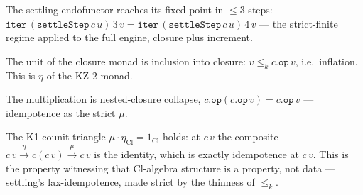 \begin{theorem}\label{thm:settle-step-settles}\leanok{}
The settling-endofunctor reaches its fixed point in $\le 3$ steps:
$\texttt{iter}\,(\texttt{settleStep}\,c\,u)\,3\,v =
\texttt{iter}\,(\texttt{settleStep}\,c\,u)\,4\,v$ --- the strict-finite regime
applied to the full engine, closure plus increment.
\end{theorem}
\begin{theorem}\label{thm:kz-unit}\leanok{}
The unit of the closure monad is inclusion into closure: $v \le_k c.\texttt{op}\,v$,
i.e.\ inflation. This is $\eta$ of the KZ $2$-monad.
\end{theorem}
\begin{theorem}\label{thm:kz-mult}\leanok{}
The multiplication is nested-closure collapse, $c.\texttt{op}(c.\texttt{op}\,v) =
c.\texttt{op}\,v$ --- idempotence as the strict $\mu$.
\end{theorem}
\begin{theorem}\label{thm:counit-triangle}\leanok{}
The K1 counit triangle $\mu \cdot \eta_{\mathrm{Cl}} = 1_{\mathrm{Cl}}$ holds: at
$c\,v$ the composite $c\,v \xrightarrow{\eta} c(c\,v) \xrightarrow{\mu} c\,v$ is
the identity, which is exactly idempotence at $c\,v$. This is the property
witnessing that $\mathrm{Cl}$-algebra structure is a property, not data ---
settling's lax-idempotence, made strict by the thinness of $\le_k$.
\end{theorem}
